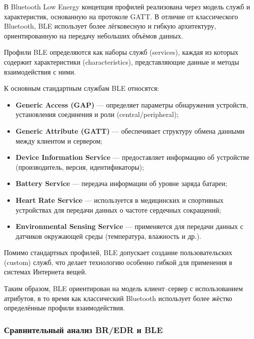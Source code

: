 В Bluetooth Low Energy концепция профилей реализована через модель служб и характеристик, основанную на протоколе GATT. В отличие от классического Bluetooth, BLE использует более лёгковесную и гибкую архитектуру, ориентированную на передачу небольших объёмов данных.

Профили BLE определяются как наборы служб (services), каждая из которых содержит характеристики (characteristics), представляющие данные и методы взаимодействия с ними.

К основным стандартным службам BLE относятся:
\begin{itemize}[nosep]
    \item \textbf{Generic Access (GAP)} --- определяет параметры обнаружения устройств, установления соединения и роли (central/peripheral);
    
    \item \textbf{Generic Attribute (GATT)} --- обеспечивает структуру обмена данными между клиентом и сервером;
    
    \item \textbf{Device Information Service} --- предоставляет информацию об устройстве (производитель, версия, идентификаторы);
    
    \item \textbf{Battery Service} --- передача информации об уровне заряда батареи;
    
    \item \textbf{Heart Rate Service} --- используется в медицинских и спортивных устройствах для передачи данных о частоте сердечных сокращений;
    
    \item \textbf{Environmental Sensing Service} --- применяется для передачи данных с датчиков окружающей среды (температура, влажность и др.).
\end{itemize}

Помимо стандартных профилей, BLE допускает создание пользовательских (custom) служб, что делает технологию особенно гибкой для применения в системах Интернета вещей.

Таким образом, BLE ориентирован на модель клиент--сервер с использованием атрибутов, в то время как классический Bluetooth использует более жёстко определённые профили взаимодействия.

\subsubsection{Сравнительный анализ BR/EDR и BLE}

